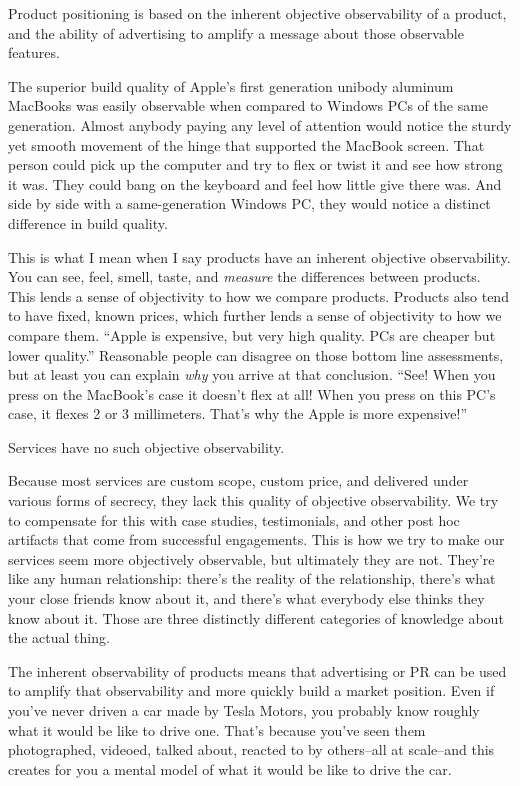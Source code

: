 Product positioning is based on the inherent objective observability of a product, and the ability of advertising to amplify a message about those observable features.

The superior build quality of Apple's first generation unibody aluminum MacBooks was easily observable when compared to Windows PCs of the same generation. Almost anybody paying any level of attention would notice the sturdy yet smooth movement of the hinge that supported the MacBook screen. That person could pick up the computer and try to flex or twist it and see how strong it was. They could bang on the keyboard and feel how little give there was. And side by side with a same-generation Windows PC, they would notice a distinct difference in build quality.

This is what I mean when I say products have an inherent objective observability. You can see, feel, smell, taste, and \emph{measure} the differences between products. This lends a sense of objectivity to how we compare products. Products also tend to have fixed, known prices, which further lends a sense of objectivity to how we compare them. ``Apple is expensive, but very high quality. PCs are cheaper but lower quality.'' Reasonable people can disagree on those bottom line assessments, but at least you can explain \emph{why} you arrive at that conclusion. ``See! When you press on the MacBook's case it doesn't flex at all! When you press on this PC's case, it flexes 2 or 3 millimeters. That's why the Apple is more expensive!''

Services have no such objective observability.

Because most services are custom scope, custom price, and delivered under various forms of secrecy, they lack this quality of objective observability. We try to compensate for this with case studies, testimonials, and other post hoc artifacts that come from successful engagements. This is how we try to make our services seem more objectively observable, but ultimately they are not. They're like any human relationship: there's the reality of the relationship, there's what your close friends know about it, and there's what everybody else thinks they know about it. Those are three distinctly different categories of knowledge about the actual thing.

The inherent observability of products means that advertising or PR can be used to amplify that observability and more quickly build a market position. Even if you've never driven a car made by Tesla Motors, you probably know roughly what it would be like to drive one. That's because you've seen them photographed, videoed, talked about, reacted to by others--all at scale--and this creates for you a mental model of what it would be like to drive the car.

